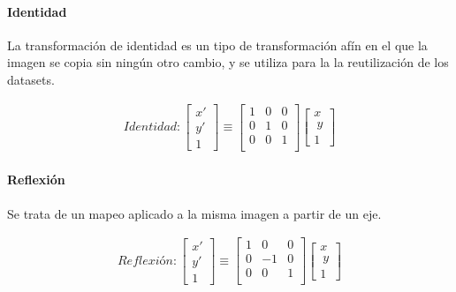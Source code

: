 \paragraph{Identidad}

La transformación de identidad es un tipo de transformación afín en el que la imagen se copia sin ningún otro cambio, y se utiliza para la  
la reutilización de los datasets.


\begin{gather}
	Identidad:
	\begin{bmatrix} x' \\ y' \\ 1 \end{bmatrix}
	\equiv
	 \begin{bmatrix}
	  1 & 0 & 0 \\
	  0 & 1 & 0 \\
	  0 & 0 & 1 \\
	  \end{bmatrix}
	  \begin{bmatrix} x \\\ y \\ 1 \end{bmatrix}
\end{gather}


\paragraph{Reflexión}

Se trata de un mapeo aplicado a la misma imagen a partir de un eje.


\begin{gather}
	Reflexión:
	\begin{bmatrix} x' \\ y' \\ 1 \end{bmatrix}
	\equiv
	 \begin{bmatrix}
	  1 & 0 & 0 \\
	  0 & -1 & 0 \\
	  0 & 0 & 1 \\
	  \end{bmatrix}
	  \begin{bmatrix} x \\\ y \\ 1 \end{bmatrix}
\end{gather}

